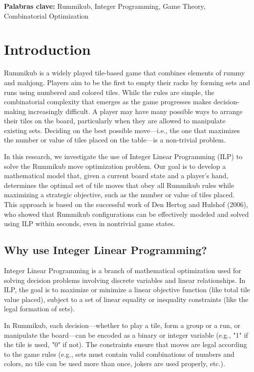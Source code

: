 \documentclass[11pt,letterpaper]{article}
\begin{document}
\smallskip
\noindent\textbf{Palabras clave:} Rummikub, Integer Programming, Game Theory, Combinatorial Optimization

\section*{Introduction}
Rummikub is a widely played tile-based game that combines elements of rummy and mahjong. 
Players aim to be the first to empty their racks by forming sets and runs using numbered 
and colored tiles. While the rules are simple, the combinatorial complexity that emerges 
as the game progresses makes decision-making increasingly difficult. A player may have 
many possible ways to arrange their tiles on the board, particularly when they are allowed 
to manipulate existing sets. Deciding on the best possible move—i.e., the one that maximizes 
the number or value of tiles placed on the table—is a non-trivial problem.

In this research, we investigate the use of Integer Linear Programming (ILP) to solve the 
Rummikub move optimization problem. Our goal is to develop a mathematical model that, given 
a current board state and a player's hand, determines the optimal set of tile moves that 
obey all Rummikub rules while maximizing a strategic objective, such as the number or 
value of tiles placed. This approach is based on the successful work of Den Hertog and 
Hulshof (2006), who showed that Rummikub configurations can be effectively modeled and 
solved using ILP within seconds, even in nontrivial game states.

\subsection*{Why use Integer Linear Programming?}
Integer Linear Programming is a branch of mathematical optimization used for solving decision
problems involving discrete variables and linear relationships. In ILP, the goal is to 
maximize or minimize a linear objective function (like total tile value placed), subject 
to a set of linear equality or inequality constraints (like the legal formation of sets).

In Rummikub, each decision—whether to play a tile, form a group or a run, or manipulate the 
board—can be encoded as a binary or integer variable (e.g., "1" if the tile is used, "0" if 
not). The constraints ensure that moves are legal according to the game rules (e.g., sets 
must contain valid combinations of numbers and colors, no tile can be used more than once, 
jokers are used properly, etc.).
\end{document}

